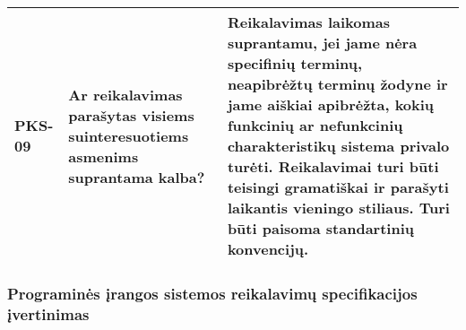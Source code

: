 \documentclass{VUMIFPSkursinis}
\begin{document}
\begin{center}
\begin{longtable}{|C{2cm}|L{5cm}|L{8cm}|}
		PKS-09                                                                        &
		Ar reikalavimas parašytas visiems suinteresuotiems asmenims suprantama kalba? &
		Reikalavimas laikomas suprantamu, jei jame nėra specifinių terminų, neapibrėžtų terminų žodyne ir jame aiškiai apibrėžta, kokių funkcinių ar nefunkcinių charakteristikų sistema privalo turėti. Reikalavimai turi būti teisingi gramatiškai ir parašyti laikantis vieningo stiliaus. Turi būti paisoma standartinių konvencijų.                                                                                                              \\ \hline
	\end{longtable}
\end{center}

\subsubsection{Programinės įrangos sistemos reikalavimų specifikacijos įvertinimas}
\end{document}
